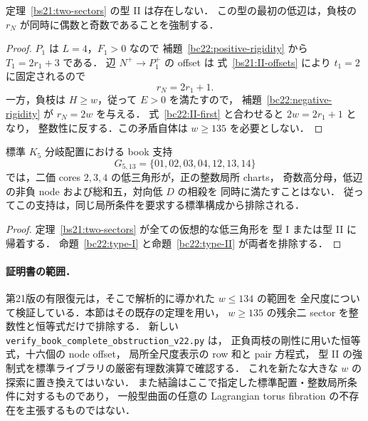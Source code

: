 \begin{proposition}[型 II の解析的排除]
\label{bc22:type-II}
定理~\ref{bs21:two-sectors} の型 II は存在しない．
この型の最初の低辺は，負枝の $r_N$ が同時に偶数と奇数であることを強制する．
\end{proposition}

\begin{proof}
$P_1$ は $L=4$，$F_1>0$ なので
補題~\ref{bc22:positive-rigidity} から $T_1=2r_1+3$ である．
辺 $N^+\to P_1^+$ の offset は
式~\eqref{bs21:II-offsets} により $t_1=2$ に固定されるので
\begin{equation}\label{bc22:II-first}
 r_N=2r_1+1.
\end{equation}
一方，負枝は $H\ge w$，従って $E>0$ を満たすので，
補題~\ref{bc22:negative-rigidity} が $r_N=2w$ を与える．
式~\eqref{bc22:II-first} と合わせると $2w=2r_1+1$ となり，
整数性に反する．この矛盾自体は $w\ge135$ を必要としない．
\end{proof}

\begin{theorem}
\label{bc22:book-obstruction}
標準 $K_5$ 分岐配置における book 支持
\[
 G_{5,13}=\{01,02,03,04,12,13,14\}
\]
では，二価 cores $2,3,4$ の低三角形が，正の整数局所 charts，
奇数高分母，低辺の非負 node および総和五，対向低 $D$ の相殺を
同時に満たすことはない．
従ってこの支持は，同じ局所条件を要求する標準構成から排除される．
\end{theorem}

\begin{proof}
定理~\ref{bs21:two-sectors} が全ての仮想的な低三角形を
型 I または型 II に帰着する．
命題~\ref{bc22:type-I} と命題~\ref{bc22:type-II} が両者を排除する．
\end{proof}

\paragraph{証明書の範囲．}
第21版の有限復元は，そこで解析的に導かれた $w\le134$ の範囲を
全尺度について検証している．本節はその既存の定理を用い，
$w\ge135$ の残余二 sector を整数性と恒等式だけで排除する．
新しい \nolinkurl{verify_book_complete_obstruction_v22.py} は，
正負両枝の剛性に用いた恒等式，十六個の node offset，
局所全尺度表示の row 和と pair 方程式，
型 II の強制式を標準ライブラリの厳密有理数演算で確認する．
これを新たな大きな $w$ の探索に置き換えてはいない．
また結論はここで指定した標準配置・整数局所条件に対するものであり，
一般型曲面の任意の Lagrangian torus fibration の不存在を主張するものではない．
